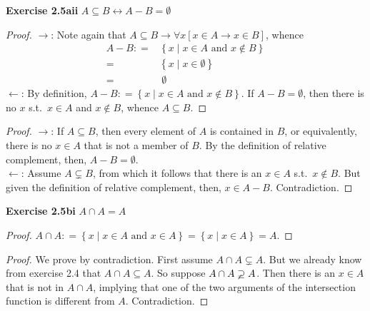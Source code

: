 \documentclass[letterpaper,12pt]{article}
\newcommand{\is}{\ensuremath{\mathrel{\mathop:}=}}
\newcommand{\setof}[1]{\ensuremath{\left \{ #1 \right \}}}
\newcommand{\exercise}[1]{\noindent \textbf{Exercise #1} \quad}
\renewcommand{\setminus}{-}
\begin{document}
\exercise{2.5aii} $A \subseteq B \leftrightarrow A \setminus B = \emptyset$
\begin{proof}
	$\rightarrow$: Note again that $A \subseteq B \rightarrow \forall x [ x \in A \rightarrow x \in B]$, whence
	\begin{align*}
		A \setminus B \is& \setof{x \mid x \in A \text{ and } x \notin B}\\
			=& \setof{x \mid x \in \emptyset}\\
			=&\ \emptyset
	\end{align*}
	$\leftarrow$: By definition, $A \setminus B \is \setof{x \mid x \in A \text{ and } x \notin B}$. If $A \setminus B = \emptyset$, then there is no $x$ s.t.\ $x \in A$ and $x \notin B$, whence $A \subseteq B$.
\end{proof}
%
\begin{proof}
	$\rightarrow$: If $A \subseteq B$, then every element of $A$ is contained in $B$, or equivalently, there is no $x \in A$ that is not a member of $B$. By the definition of relative complement, then, $A \setminus B = \emptyset$.\\
	$\leftarrow$: Assume $A \varsubsetneq B$, from which it follows that there is an $x \in A$ s.t.\ $x \notin B$. But given the definition of relative complement, then, $x \in A \setminus B$. Contradiction.
\end{proof}


\exercise{2.5bi} $A \cap A = A$
\begin{proof}
	$A \cap A \is \setof{x \mid x \in A \text{ and } x \in A} = \setof{ x \mid x \in A} = A$.
\end{proof}
%
\begin{proof}
	We prove by contradiction. First assume $A \cap A \varsubsetneq A$. But we already know from exercise 2.4 that $A \cap A \subseteq A$. So suppose $A \cap A \varsupsetneq A$. Then there is an $x \in A$ that is not in $A \cap A$, implying that one of the two arguments of the intersection function is different from $A$. Contradiction.
\end{proof}
\end{document}
